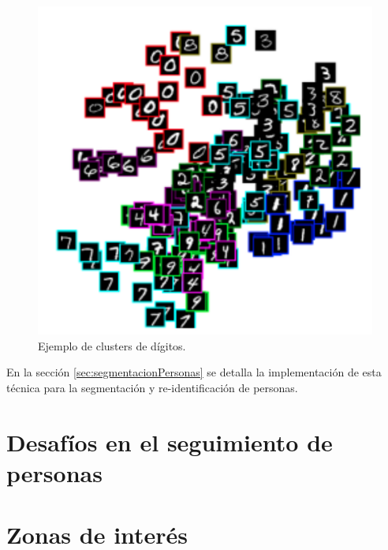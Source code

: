 \begin{figure}[ht]
	\centering
	\includegraphics[scale=0.7]{./Figures/clusterDigitos.png}
	\caption{Ejemplo de clusters de dígitos.}
	\label{fig:clusterDigitos}
\end{figure}

En la sección \ref{sec:segmentacionPersonas} se detalla la implementación de esta técnica para la segmentación y re-identificación de personas.

\newpage


\section{Desafíos en el seguimiento de personas}
\label{sec:desafiosSeguimiento}


\section{Zonas de interés}
\label{sec:zonasInteres}
